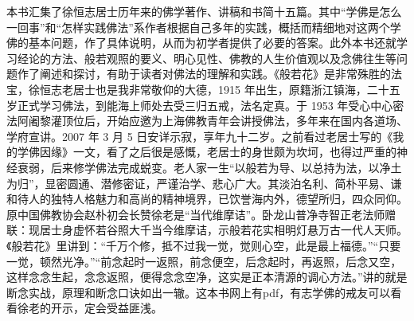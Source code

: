 \begin{book}
    本书汇集了徐恒志居士历年来的佛学著作、讲稿和书简十五篇。其中“学佛是怎么一回事”和“怎样实践佛法”系作者根据自己多年的实践，概括而精细地对这两个学佛的基本问题，作了具体说明，从而为初学者提供了必要的答案。此外本书还就学习经论的方法、般若观照的要义、明心见性、佛教的人生价值观以及念佛往生等问题作了阐述和探讨，有助于读者对佛法的理解和实践。《般若花》是非常殊胜的法宝，徐恒志老居士也是我非常敬仰的大德，1915 年出生，原籍浙江镇海，二十五岁正式学习佛法，到能海上师处去受三归五戒，法名定真。于 1953 年受心中心密法阿阇黎灌顶位后，开始应邀为上海佛教青年会讲授佛法，多年来在国内各道场、学府宣讲。2007 年 3 月 5 日安详示寂，享年九十二岁。之前看过老居士写的《我的学佛因缘》一文，看了之后很是感慨，老居士的身世颇为坎坷，也得过严重的神经衰弱，后来修学佛法完成蜕变。老人家一生“以般若为导、以总持为法，以净土为归”，显密圆通、潜修密证，严谨治学、悲心广大。其淡泊名利、简朴平易、谦和待人的独特人格魅力和高尚的精神境界，已饮誉海内外，德望所归，四众同仰。原中国佛教协会赵朴初会长赞徐老是“当代维摩诘”。卧龙山普净寺智正老法师赠联：现居士身虚怀若谷照大千当今维摩诘，示般若花实相明灯悬万古一代人天师。《般若花》里讲到：“千万个修，抵不过我一觉，觉则心空，此是最上福德。”“只要一觉，顿然光净。”“前念起时一返照，前念便空，后念起时，再返照，后念又空，这样念念生起，念念返照，便得念念空净，这实是正本清源的调心方法。”讲的就是断念实战，原理和断念口诀如出一辙。这本书网上有pdf，有志学佛的戒友可以看看徐老的开示，定会受益匪浅。
\end{book}
